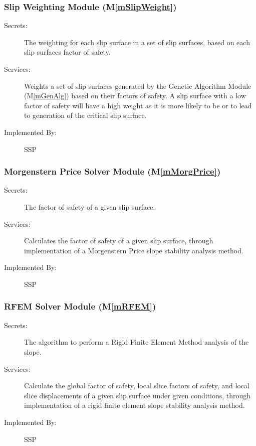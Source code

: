 \documentclass[12pt]{article}
\newcommand{\progname}{SSP}
\newcommand{\mref}[1]{M\ref{#1}}
\begin{document}
\subsubsection{Slip Weighting Module (\mref{mSlipWeight})}

\begin{description}
\item[Secrets:] The weighting for each slip surface in a set of slip
  surfaces, based on each slip surfaces factor of safety.
\item[Services:] Weights a set of slip surfaces generated by the
  Genetic Algorithm Module (\mref{mGenAlg}) based on their factors of
  safety. A slip surface with a low factor of safety will have a high
  weight as it is more likely to be or to lead to generation of the
  critical slip surface.
\item[Implemented By:] \progname
\end{description} 

\subsubsection{Morgenstern Price Solver Module (\mref{mMorgPrice})}

\begin{description}
\item[Secrets:] The factor of safety of a given slip surface.
\item[Services:] Calculates the factor of safety of a given slip
  surface, through implementation of a Morgenstern Price slope
  stability analysis method.
\item[Implemented By:] \progname
\end{description} 


\subsubsection{RFEM Solver Module (\mref{mRFEM})}

\begin{description}
\item[Secrets:] The algorithm to perform a Rigid Finite Element Method
  analysis of the slope.
\item[Services:] Calculate the global factor of safety, local slice
  factors of safety, and local slice displacements of a given slip
  surface under given conditions, through implementation of a rigid
  finite element slope stability analysis method.
\item[Implemented By:] \progname
\end{description}
\end{document}
